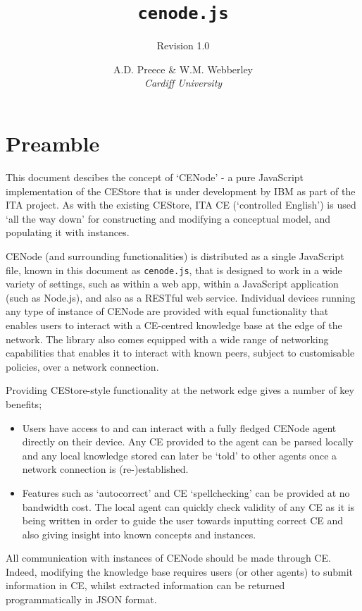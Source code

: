\documentclass{scrartcl}
\title{\texttt{cenode.js}}
\subtitle{Revision 1.0}
\author{A.D. Preece \& W.M. Webberley \\ \textit{Cardiff University}}
\date{}
\begin{document}
\maketitle

\section*{Preamble}
This document descibes the concept of `CENode' - a pure JavaScript implementation of the CEStore that is under development by IBM as part of the ITA project. As with the existing CEStore, ITA CE (`controlled English') is used `all the way down' for constructing and modifying a conceptual model, and populating it with instances. 

CENode (and surrounding functionalities) is distributed as a single JavaScript file, known in this document as \texttt{cenode.js}, that is designed to work in a wide variety of settings, such as within a web app, within a JavaScript application (such as Node.js), and also as a RESTful web service. Individual devices running any type of instance of CENode are provided with equal functionality that enables users to interact with a CE-centred knowledge base at the edge of the network. The library also comes equipped with a wide range of networking capabilities that enables it to interact with known peers, subject to customisable policies, over a network connection.

Providing CEStore-style functionality at the network edge gives a number of key benefits;
\begin{itemize}
    \item Users have access to and can interact with a fully fledged CENode agent directly on their device. Any CE provided to the agent can be parsed locally and any local knowledge stored can later be `told' to other agents once a network connection is (re-)established.
    \item Features such as `autocorrect' and CE `spellchecking' can be provided at no bandwidth cost. The local agent can quickly check validity of any CE as it is being written in order to guide the user towards inputting correct CE and also giving insight into known concepts and instances.
\end{itemize}

All communication with instances of CENode should be made through CE. Indeed, modifying the knowledge base requires users (or other agents) to submit information in CE, whilst extracted information can be returned programmatically in JSON format.
\end{document}
